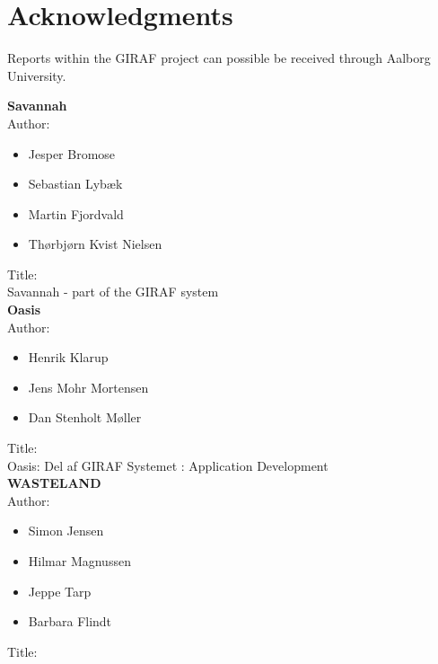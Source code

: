 \chapter{Acknowledgments}
\label{acknowledgement}
Reports within the GIRAF project can possible be received through Aalborg University.   

\textbf{Savannah}\\
Author:\\ 
\begin{itemize}
\item Jesper Bromose\\
\item Sebastian Lybæk\\
\item Martin Fjordvald\\
\item Thørbjørn Kvist Nielsen\\
\end{itemize}

Title:\\
Savannah - part of the GIRAF system\\

\textbf{Oasis}\\
Author:\\
\begin{itemize}
\item Henrik Klarup\\
\item Jens Mohr Mortensen\\
\item Dan Stenholt Møller\\
\end{itemize}

Title:\\
Oasis: Del af GIRAF Systemet : Application Development\\


\textbf{WASTELAND}\\
Author:\\
\begin{itemize}
\item Simon Jensen\\
\item Hilmar Magnussen\\
\item Jeppe Tarp\\
\item Barbara Flindt\\
\end{itemize}
Title:\\


